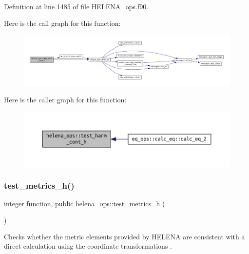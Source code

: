 Definition at line 1485 of file H\+E\+L\+E\+N\+A\+\_\+ops.\+f90.

Here is the call graph for this function\+:\nopagebreak
\begin{figure}[H]
\begin{center}
\leavevmode
\includegraphics[width=350pt]{namespacehelena__ops_a83f2ad5dc967c7bae287b60fddb8eb0a_cgraph}
\end{center}
\end{figure}
Here is the caller graph for this function\+:\nopagebreak
\begin{figure}[H]
\begin{center}
\leavevmode
\includegraphics[width=350pt]{namespacehelena__ops_a83f2ad5dc967c7bae287b60fddb8eb0a_icgraph}
\end{center}
\end{figure}
\mbox{\label{namespacehelena__ops_a0f156b3653264fb016d6d311eb59114c}} 
\subsubsection{\texorpdfstring{test\+\_\+metrics\+\_\+h()}{test\_metrics\_h()}}
{\footnotesize\ttfamily integer function, public helena\+\_\+ops\+::test\+\_\+metrics\+\_\+h (\begin{DoxyParamCaption}{ }\end{DoxyParamCaption})}



Checks whether the metric elements provided by H\+E\+L\+E\+NA are consistent with a direct calculation using the coordinate transformations \cite{Weyens3D}. 

